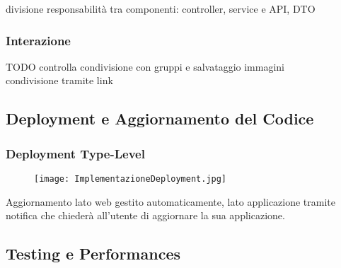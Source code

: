 divisione responsabilità tra componenti: controller, service e API, DTO\\
\subsubsection{Interazione}
TODO controlla condivisione con gruppi e salvataggio immagini\\
condivisione tramite link
\newpage

\subsection{Deployment e Aggiornamento del Codice}

\subsubsection{Deployment Type-Level}

\begin{figure}[h!]
    \begin{center}
        \texttt{[image: ImplementazioneDeployment.jpg]}
    \end{center}
\end{figure}
Aggiornamento lato web gestito automaticamente, lato applicazione tramite notifica che chiederà all'utente di aggiornare la sua applicazione.
\newpage
\subsection{Testing e Performances}
